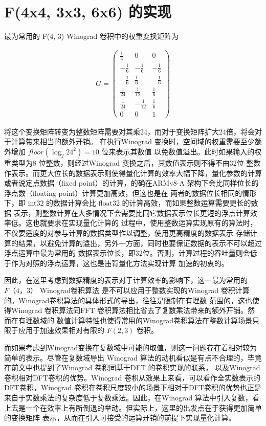 \iffalse
\section{F(4x4, 3x3, 6x6) 的实现}

最为常用的 F(4, 3) Winograd 卷积中的权重变换矩阵为

\begin{align}
\label{eq:winograd_f43}
  G = 
  \begin{pmatrix}
    \frac{1}{4} & 0 & 0 \\
    -\frac{1}{6} & -\frac{1}{6} & -\frac{1}{6} \\
    -\frac{1}{6} & \frac{1}{6} & -\frac{1}{6} \\
    \frac{1}{24} & \frac{1}{12} & \frac{1}{6} \\
    \frac{1}{24} & -\frac{1}{12} & \frac{1}{6} \\
    0 & 0 & 1
  \end{pmatrix}
\end{align}

将这个变换矩阵转变为整数矩阵需要对其乘24，而对于变换矩阵扩大24倍，将会对于计算带来相当的额外开销。
在执行Winograd 变换时，空间域的权重需要至少额外增加 $floor(\log_{2}{24^2}) = 10$ 位来表示其数值
以免数值溢出。此时如果输入的权重类型为8 位整数，则经过Winograd 变换之后，其数值表示则不得不由32位
整数作表示。而更大位长的数据表示则使得量化计算的效率大幅下降，量化参数的计算或者说定点数据（fixed 
point）的计算，的确在ARMv8-A 架构下会比同样位长的浮点数（floating point）计算更加高效，但这也是在
两者的数据位长相同的情形下，即 int32 的数据计算会比 float32 的计算高效，而如果整数运算需要更长的数据
表示，则整数计算在大多情况下会需要比同它数据表示位长更短的浮点计算效率低。这也就要求在实现量化计算的
过程中，使用整数运算实现原有的算法时，不仅要适度的对参与计算的数据类型作以调整，使用更高精度的数据表示
存储计算的结果，以避免计算的溢出，另外一方面，同时也要保证数据的表示不可以超过浮点运算中最为常用的
数据表示位长，即32位。否则，计算过程的吞吐量则会低于作为对照的浮点运算，这也是违背量化方法实现计算
加速的初衷的。

因此，在这里考虑到数据精度的表示对于计算效率的影响下，这一最为常用的 $F（4， 3）$ Winograd卷积算法
是不可以应用于整数实现的Winograd 卷积计算的。Winograd卷积算法的具体形式的导出，往往是限制在有理数
范围的，这也使得Winograd 卷积算法同FFT 卷积算法相比省去了复数乘法带来的额外开销。然而在有理数域的
数值计算特性也使得常用的Winograd卷积算法在整数计算场景只限于应用于加速效果相对有限的 $F(2, 3)$ 卷积。

而如果考虑到Winograd变换在复数域中可能的取值，则这一问题存在着相对较为简单的表示。尽管在复数域导出
Winograd 算法的动机看似是有点不合理的，毕竟在前文中也提到了Winograd 卷积同基于DFT 的卷积实现的联系，
以及Winograd 卷积相对DFT卷积的优势。Winograd 卷积从效果上来看，可以看作全实数表示的DFT卷积，Winograd
卷积在卷积尺度较小的场景下相对于DFT卷积的优势也正是来自于实数乘法的复杂度低于复数乘法。因此，在Winograd
算法中引入复数，看上去是一个在效率上有所倒退的举动。但实际上，这里的出发点在于获得更加简单的变换矩阵
表示，从而在引入可接受的运算开销的前提下实现量化计算。


